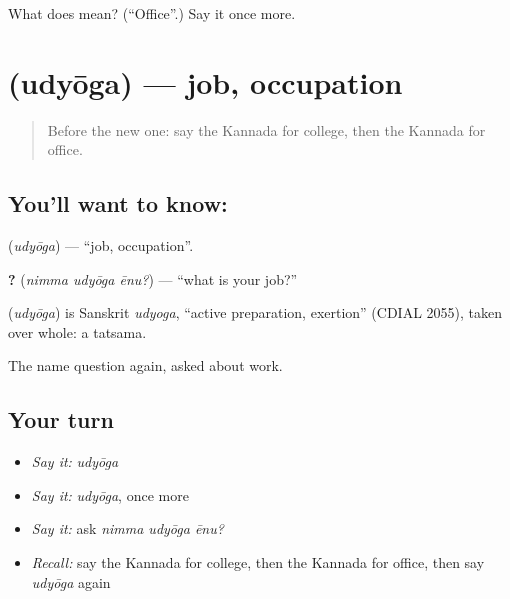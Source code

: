 \begin{tcolorbox}[breakable,colback=teal!4,colframe=teal!35!black,title={Before you move on}]
What does  mean? (\textquotedblleft{}Office\textquotedblright{}.) Say it once more.
\end{tcolorbox}
\section[\texorpdfstring{\kn{ಉದ್ಯೋಗ} (udyōga)}{ಉದ್ಯೋಗ (udyōga)}]{ (udyōga) — job, occupation}

\label{lesson:KA-C92-job}



\begin{quote}
Before the new one: say the Kannada for college, then the Kannada for office.
\end{quote}

\subsection*{You'll want to know: }
\textbf{} (\emph{udyōga}) — \textquotedblleft{}job, occupation\textquotedblright{}.

\textbf{  ?} (\emph{nimma udyōga ēnu?}) — \textquotedblleft{}what is your job?\textquotedblright{}

\begin{cousinweb}
\textbf{} (\emph{udyōga}) is Sanskrit \emph{udyoga}, \textquotedblleft{}active preparation, exertion\textquotedblright{} (CDIAL 2055), taken over whole: a tatsama.
\end{cousinweb}

\begin{grammarlens}[title={What you've built}]
The name question again, asked about work.
\end{grammarlens}

\subsection*{Your turn}
\begin{itemize}
\raggedright
  \item \emph{Say it:} \emph{udyōga}
  \item \emph{Say it:} \emph{udyōga}, once more
  \item \emph{Say it:} ask \emph{nimma udyōga ēnu?}
  \item \emph{Recall:} say the Kannada for college, then the Kannada for office, then say \emph{udyōga} again
\end{itemize}

